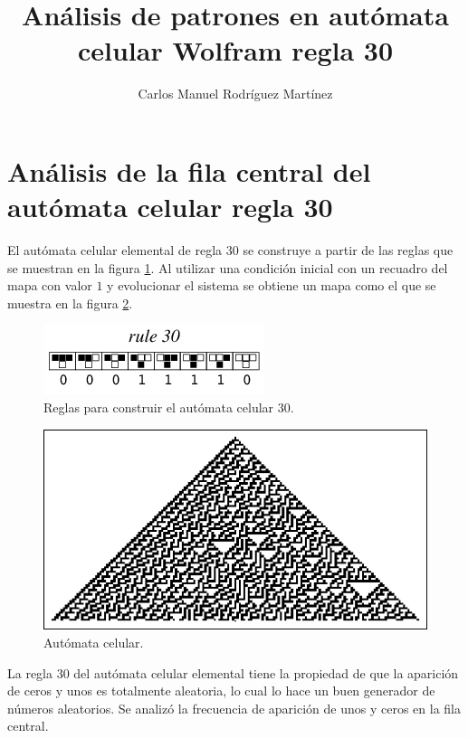 \documentclass[letterpaper,11pt]{article}
\author{Carlos Manuel Rodríguez Martínez}
\title{Análisis de patrones en autómata celular Wolfram regla 30}
\begin{document}
\maketitle

\section{Análisis de la fila central del autómata celular regla 30}
El autómata celular elemental de regla 30 se construye a partir de las reglas que se muestran en la figura \ref{fig:reglas}. Al utilizar una condición inicial con un recuadro del mapa con valor $1$ y evolucionar el sistema se obtiene un mapa como el que se muestra en la figura \ref{fig:automata}.

\begin{figure}[h!]
\centering
\includegraphics[scale=0.6]{img/Reglas}
\caption{Reglas para construir el autómata celular 30. \cite{MathWorld}}
\label{fig:reglas}
\end{figure}

\begin{figure}[h!]
\centering
\includegraphics[scale=0.5]{img/Figura1}
\caption{Autómata celular.}
\label{fig:automata}
\end{figure}

La regla 30 del autómata celular elemental tiene la propiedad de que la aparición de ceros y unos es totalmente aleatoria, lo cual lo hace un buen generador de números aleatorios. Se analizó la frecuencia de aparición de unos y ceros en la fila central.
\end{document}
